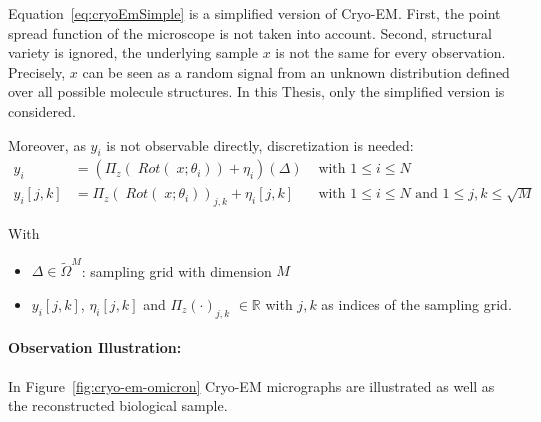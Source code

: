 Equation~\ref{eq:cryoEmSimple} is a simplified version of Cryo-EM.
First, the point spread function of the microscope is not taken into account.
Second, structural variety is ignored, the underlying sample $x$ is not the same 
for every observation. 
Precisely, $x$ can be seen as a random signal from an unknown distribution defined over all possible molecule structures.
In this Thesis, only the simplified version is considered.

Moreover, as $y_i$ is not observable directly, discretization is needed:
\begin{equation}
    \label{eq:cryoEmSimpleDiscrete}
    \begin{aligned}
        y_i &= \left( \Pi_z (\; Rot (\;x; \theta_i)) + \eta_i\right)(\Delta) & \text{ with } 1 \leq i \leq N \\
        y_i[j,k] &= \Pi_z (\; Rot(\;x; \theta_i))_{j,k} + \eta_i[j,k] & \text{ with } 1 \leq i \leq N \text{ and } 1 \leq j,k \leq \sqrt{M}
    \end{aligned}
\end{equation}

With
\begin{itemize}
    \item $\Delta \in \tilde{\Omega}^{M}$: sampling grid with dimension $M$
    \item $y_i[j,k]$, $\eta_i[j,k]$ and $\Pi_z(\cdot)_{j,k}$ $ \in \mathbb{R}$ with $j,k$ as indices of the sampling grid.
\end{itemize}


\paragraph{Observation Illustration:}
In Figure~\ref{fig:cryo-em-omicron} Cryo-EM micrographs are illustrated as well as the reconstructed biological sample.

